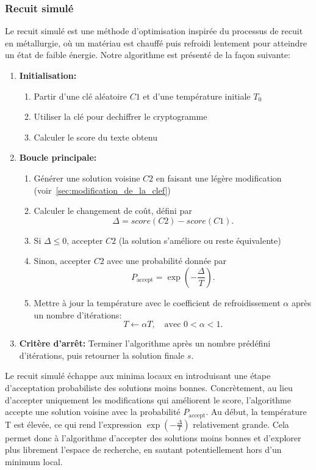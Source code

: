 \documentclass[a4paper]{article}
\begin{document}
\subsubsection{Recuit simulé}
Le recuit simulé est une méthode d’optimisation inspirée du processus de recuit en métallurgie, où un matériau est chauffé puis refroidi lentement pour atteindre un état de faible énergie.
Notre algorithme est présenté de la façon suivante:
\begin{enumerate}
    \item \textbf{Initialisation:} 
    \begin{enumerate}
        \item Partir d'une clé aléatoire $C1$ et d'une température initiale $T_0$
        \item Utiliser la clé pour dechiffrer le cryptogramme
        \item Calculer le score du texte obtenu
    \end{enumerate}
    \item \textbf{Boucle principale:}
    \begin{enumerate}[label= (\alph*)]
        \item Générer une solution voisine $C2$ en faisant une légère modification (voir~\ref{sec:modification_de_la_clef})
        \item Calculer le changement de coût, défini par
        \[
            \Delta = score(C2) - score(C1).
        \]
        \item Si $\Delta \leq 0$, accepter $C2$ (la solution s'améliore ou reste équivalente)
        \item Sinon, accepter $C2$ avec une probabilité donnée par
        \[
            P_{\text{accept}} = \exp\left(-\frac{\Delta}{T}\right).
        \]
        \item Mettre à jour la température avec le coefficient de refroidissement $\alpha$ après un nombre d'itérations:
        \[
            T \leftarrow \alpha T, \quad \text{avec } 0 < \alpha < 1.
        \]
    \end{enumerate}
    
    \item \textbf{Critère d'arrêt:} Terminer l'algorithme après un nombre prédéfini d'itérations, puis retourner la solution finale $s$.
\end{enumerate}


Le recuit simulé échappe aux minima locaux en introduisant une étape d'acceptation probabiliste des solutions moins bonnes. Concrètement, au lieu d'accepter uniquement les modifications qui améliorent le score, l'algorithme accepte une solution voisine avec la probabilité $P_{\text{accept}}$.
Au début, la température T est élevée, ce qui rend l'expression $\exp\left(-\frac{\Delta}{T}\right)$ relativement grande. Cela permet donc à l'algorithme d'accepter des solutions moins bonnes et d'explorer plus librement l'espace de recherche, en sautant potentiellement hors d'un minimum local.
\end{document}
